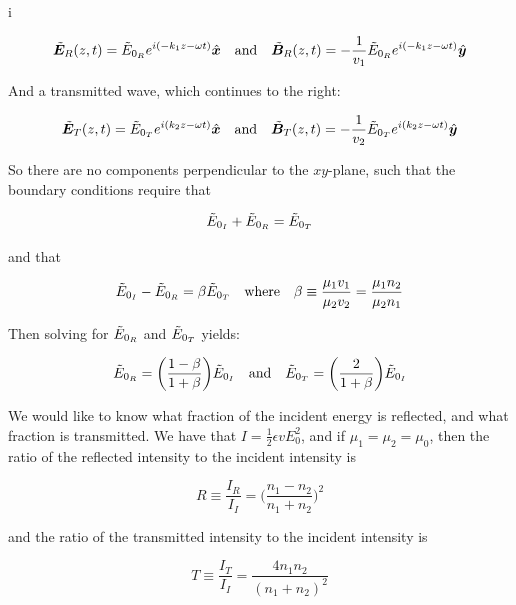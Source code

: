 i\documentclass[a4paper]{article}
\begin{document}
\begin{align*}
    \Tilde{\bm{E}}_R(z, t) = \Tilde{E}_{0_{R}}e^{i(-k_1z-\omega t)}\hat{\bm{x}}\quad\text{and}\quad
    \Tilde{\bm{B}}_R(z, t) = -\frac{1}{v_1}\Tilde{E}_{0_{R}}e^{i(-k_1z-\omega t)}\hat{\bm{y}}
\end{align*}

And a transmitted wave, which continues to the right:

\begin{align*}
    \Tilde{\bm{E}}_T(z, t) = \Tilde{E}_{0_{T}}e^{i(k_2z-\omega t)}\hat{\bm{x}}\quad\text{and}\quad
    \Tilde{\bm{B}}_T(z, t) = -\frac{1}{v_2}\Tilde{E}_{0_{T}}e^{i(k_2z-\omega t)}\hat{\bm{y}}
\end{align*}

So there are no components perpendicular to the $xy$-plane, such that the boundary conditions require that

\begin{equation*}
    \Tilde{E}_{0_{I}}+\Tilde{E}_{0_{R}}=\Tilde{E}_{0_{T}}
\end{equation*}

and that

\begin{equation*}
    \Tilde{E}_{0_{I}}-\Tilde{E}_{0_{R}}=\beta\Tilde{E}_{0_{T}}\quad\text{where}\quad \beta\equiv\frac{\mu_1v_1}{\mu_2v_2}=\frac{\mu_1n_2}{\mu_2n_1}
\end{equation*}

Then solving for $\Tilde{E}_{0_{R}}$ and $\Tilde{E}_{0_{T}}$ yields:

\begin{equation*}
    \Tilde{E}_{0_{R}}=\bigg(\frac{1-\beta}{1+\beta}\bigg)\Tilde{E}_{0_{I}}\quad\text{and}\quad\Tilde{E}_{0_{T}}=\bigg(\frac{2}{1+\beta}\bigg)\Tilde{E}_{0_{I}}
\end{equation*}

We would like to know what fraction of the incident energy is reflected, and what fraction is transmitted. We have that $I=\frac{1}{2}\epsilon vE_0^2$, and if $\mu_1=\mu_2=\mu_0$, then the ratio of the reflected intensity to the incident intensity is

\begin{equation*}
    R\equiv\frac{I_R}{I_I}=\bigg(\frac{n_1-n_2}{n_1+n_2}\bigg)^2
\end{equation*}

and the ratio of the transmitted intensity to the incident intensity is

\begin{equation*}
    T\equiv\frac{I_T}{I_I}=\frac{4n_1n_2}{(n_1+n_2)^2}
\end{equation*}
\end{document}
